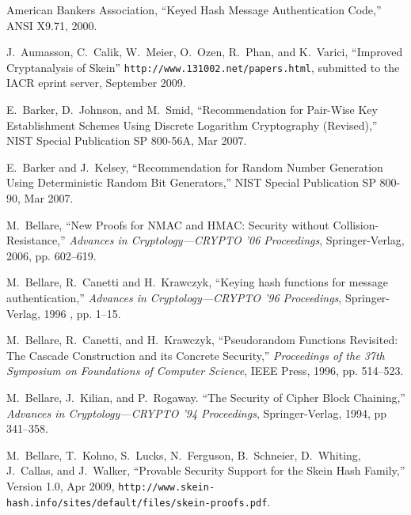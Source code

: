 \documentclass[11pt,twoside]{article}
\begin{document}
\clearpage

\endgroup %



{\sloppy{}
\begin{thebibliography}{19}

 American Bankers Association, ``Keyed Hash Message Authentication Code,'' ANSI X9.71, 2000.

 J.~Aumasson, C.~Calik, W.~Meier, O.~Ozen, R.~Phan, and K.~Varici, ``Improved Cryptanalysis of Skein''
\texttt{http://www.131002.net/papers.html}, submitted to the IACR eprint server, September 2009.

 E.~Barker, D.~Johnson, and M.~Smid, ``Recommendation for Pair-Wise Key Establishment Schemes Using Discrete Logarithm Cryptography (Revised),'' NIST Special Publication SP 800-56A, Mar 2007.

 E.~Barker and J.~Kelsey, ``Recommendation for Random Number Generation Using Deterministic Random Bit Generators,'' NIST Special Publication SP 800-90, Mar 2007.

 M.~Bellare, ``New Proofs for NMAC and HMAC: Security without Collision-Resistance,'' {\it Advances in Cryptology---CRYPTO '06 Proceedings}, Springer-Verlag, 2006, pp. 602--619.

 M.~Bellare, R.~Canetti and H.~Krawczyk, ``Keying hash functions for message authentication,'' {\it Advances in Cryptology---CRYPTO '96 Proceedings}, Springer-Verlag, 1996 , pp. 1--15.

 M.~Bellare, R.~Canetti, and H.~Krawczyk, ``Pseudorandom Functions Revisited: The Cascade Construction and its Concrete Security,'' {\it Proceedings of the 37th Symposium on Foundations of Computer Science}, IEEE Press, 1996, pp. 514--523.

 M.~Bellare, J.~Kilian, and P.~Rogaway.  ``The Security of Cipher Block Chaining,'' {\it Advances in Cryptology---CRYPTO '94 Proceedings}, Springer-Verlag, 1994, pp 341--358.

 M.~Bellare, T.~Kohno, S.~Lucks, N.~Ferguson, B.~Schneier, D.~Whiting, J.~Callas, and J.~Walker, ``Provable Security Support for the Skein Hash Family,'' Version 1.0, Apr 2009, {\tt http://www.skein-hash.info/sites/default/files/skein-proofs.pdf}.


\end{thebibliography}}
\end{document}
